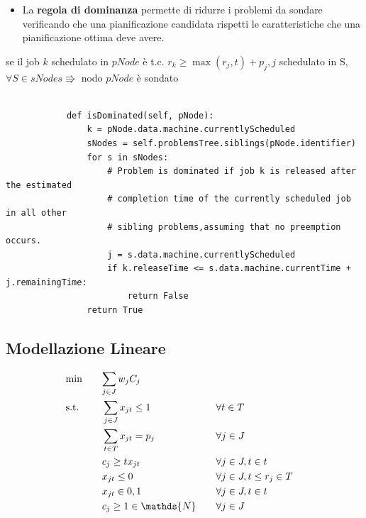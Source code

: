 \documentclass[compress]{beamer}
\begin{document}
    \begin{frame}[fragile]{\subsecname}
        \begin{itemize}
            \item La \textbf{regola di dominanza} permette di ridurre i problemi da sondare verificando
            che una pianificazione candidata rispetti le caratteristiche che una 
            pianificazione ottima deve avere.
        \end{itemize}
        \begin{theorem}
            se il job $k$ schedulato in $pNode$ è t.c. $r_k \geq \max(r_j, t) + p_j, j$ schedulato in S, $\forall S \in sNodes \Rrightarrow $ nodo $pNode$ è sondato
        \end{theorem}
        \begin{verbatim}
                                                    
            def isDominated(self, pNode):
                k = pNode.data.machine.currentlyScheduled        
                sNodes = self.problemsTree.siblings(pNode.identifier)
                for s in sNodes:
                    # Problem is dominated if job k is released after the estimated
                    # completion time of the currently scheduled job in all other
                    # sibling problems,assuming that no preemption occurs.
                    j = s.data.machine.currentlyScheduled
                    if k.releaseTime <= s.data.machine.currentTime + j.remainingTime:
                        return False
                return True
        \end{verbatim}
    \end{frame}

    \subsection{Modellazione Lineare}
    \begin{frame}{\subsecname}
        
        \begin{alignat}{4}
          & \text{min} \quad && \mathrlap{\sum_{j \in J} w_j C_j } \\ %
          & \text{s.t.} \quad && \sum_{j \in J} x_{jt} \leq 1 \quad && \forall t \in T \\
          & && \sum_{t \in T} x_{jt} = p_j \quad && \forall j \in J \\
          & && c_j \geq tx_{jt} \quad && \forall j \in J, t \in t \\
          & && x_{jt} \leq 0 \quad && \forall j \in J, t \leq r_j \in T\\
          & && x_{jt} \in {0, 1} \quad && \forall j \in J, t \in t\\
          & && c_j \geq 1 \in \mathds{N} \quad && \forall j \in J 
        \end{alignat}
    \end{frame}
\end{document}
